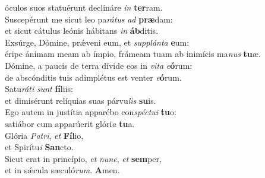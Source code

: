 \evenverse óculos suos statuérunt declináre \textit{in} \textbf{ter}ram.\\
\oddverse Suscepérunt me sicut leo pa\textit{rá}\textit{tus} \textit{ad} \textbf{præ}dam:~\*\\
\oddverse et sicut cátulus leónis hábitans \textit{in} \textbf{áb}ditis.\\
\evenverse Exsúrge, Dómine, prǽveni eum, et \textit{sup}\textit{plán}\textit{ta} \textbf{e}um:~\*\\
\evenverse éripe ánimam meam ab ímpio, frámeam tuam ab inimícis ma\textit{nus} \textbf{tu}æ.\\
\oddverse Dómine, a paucis de terra dívide eos in \textit{vi}\textit{ta} \textit{e}\textbf{ó}rum:~\*\\
\oddverse de abscónditis tuis adimplétus est venter \textit{e}\textbf{ó}rum.\\
\evenverse Satu\textit{rá}\textit{ti} \textit{sunt} \textbf{fí}liis:~\*\\
\evenverse et dimisérunt relíquias suas párvu\textit{lis} \textbf{su}is.\\
\oddverse Ego autem in justítia apparébo con\textit{spé}\textit{ctu}\textit{i} \textbf{tu}o:~\*\\
\oddverse satiábor cum apparúerit glóri\textit{a} \textbf{tu}a.\\
\evenverse Glória \textit{Pa}\textit{tri}, \textit{et} \textbf{Fí}lio,~\*\\
\evenverse et Spirítu\textit{i} \textbf{San}cto.\\
\oddverse Sicut erat in princípio, \textit{et} \textit{nunc}, \textit{et} \textbf{sem}per,~\*\\
\oddverse et in sǽcula sæculó\textit{rum}. \textbf{A}men.\\
